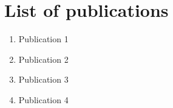 \chapter{List of publications}
\blindtext

\begin{enumerate}[label=\roman*.]
    \item Publication 1
    \item Publication 2
    \item Publication 3
    \item Publication 4
\end{enumerate}

